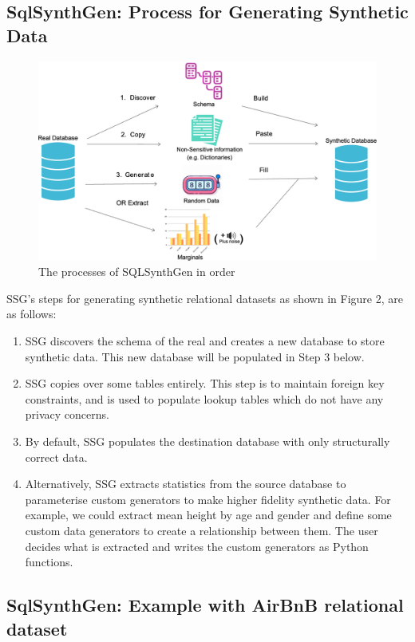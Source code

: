 \documentclass[11pt]{article}
\begin{document}
\subsection{SqlSynthGen: Process for Generating Synthetic Data}

\begin{figure}[ht]
\centering
\includegraphics[width=0.8\linewidth]{figures/SSG.png}
\caption{The processes of SQLSynthGen in order}
\label{fig:Range of fidelity for synthetic data}
\end{figure}

SSG's steps for generating synthetic relational datasets as shown in Figure 2, are as follows:

\begin{enumerate}
    \item SSG discovers the schema of the real and creates a new database to store synthetic data. This new database will be populated in Step 3 below. 
    \item SSG copies over some tables entirely. This step is to maintain foreign key constraints, and is used to populate lookup tables which do not have any privacy concerns.
    \item By default, SSG populates the destination database with only structurally correct data. \item Alternatively, SSG extracts statistics from the source database to parameterise custom generators to make higher fidelity synthetic data. For example, we could extract mean height by age and gender and define some custom data generators to create a relationship between them. The user decides what is extracted and writes the custom generators as Python functions.
\end{enumerate}

\subsection{SqlSynthGen: Example with AirBnB relational dataset}
\end{document}
